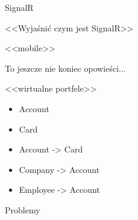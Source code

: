 \documentclass{beamer}
\begin{document}
\begin{frame}{}
	\begin{center}
		\huge{SignalR}
	\end{center}
\end{frame}

\begin{frame}{}
	\begin{center}
		\huge{<<Wyjaśnić czym jest SignalR>>}
	\end{center}
\end{frame}

\begin{frame}{}
	\begin{center}
		\huge{<<mobile>>}
	\end{center}
\end{frame}

\begin{frame}{}
	\begin{center}
		\Huge{To jeszcze nie koniec opowieści...}
	\end{center}
\end{frame}

\begin{frame}{}
	\begin{center}
		\huge{<<wirtualne portfele>>}
	\end{center}
\end{frame}

\begin{frame}{}
	\begin{huge}
		\begin{itemize}[<+->]
			\item Account
			\item Card
		\end{itemize}
	\end{huge}
\end{frame}

\begin{frame}{}
	\begin{huge}
		\begin{itemize}[<+->]
			\item Account -> Card
			\item Company -> Account
			\item Employee -> Account
		\end{itemize}
	\end{huge}
\end{frame}

\begin{frame}{}
	\begin{center}
		\huge{Problemy}
	\end{center}
\end{frame}
\end{document}
